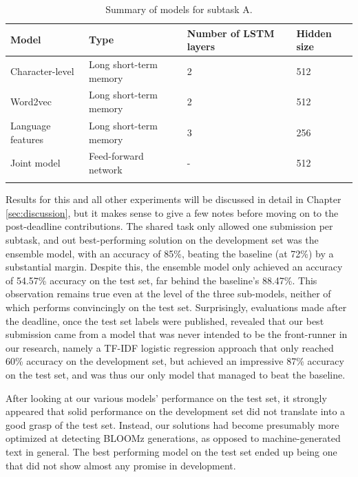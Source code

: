 \begin{table}[ht]
    \centering
    \begin{tabular}{llll}
        \hline
        \textbf{Model}    & \textbf{Type}          & \textbf{Number of LSTM layers} & \textbf{Hidden size} \\
        \hline
        Character-level   & Long short-term memory & 2                              & 512                  \\
        Word2vec          & Long short-term memory & 2                              & 512                  \\
        Language features & Long short-term memory & 3                              & 256                  \\
        Joint model       & Feed-forward network   & -                              & 512                  \\
        \hline
        \vspace{0.1cm}
    \end{tabular}
    \caption{Summary of models for subtask A.}
    \label{tab:a_models}
\end{table}

Results for this and all other experiments will be discussed in detail in Chapter \ref{sec:discussion}, but it makes sense to give a few notes before moving on to the post-deadline contributions.
The shared task only allowed one submission per subtask, and out best-performing solution on the development set was the ensemble model, with an accuracy of 85\%, beating the baseline (at 72\%) by a substantial margin.
Despite this, the ensemble model only achieved an accuracy of 54.57\% accuracy on the test set, far behind the baseline's 88.47\%.
This observation remains true even at the level of the three sub-models, neither of which performs convincingly on the test set.
Surprisingly, evaluations made after the deadline, once the test set labels were published, revealed that our best submission came from a model that was never intended to be the front-runner in our research, namely a TF-IDF logistic regression approach that only reached 60\% accuracy on the development set, but achieved an impressive 87\% accuracy on the test set, and was thus our only model that managed to beat the baseline.

After looking at our various models' performance on the test set, it strongly appeared that solid performance on the development set did not translate into a good grasp of the test set.
Instead, our solutions had become presumably more optimized at detecting BLOOMz generations, as opposed to machine-generated text in general.
The best performing model on the test set ended up being one that did not show almost any promise in development.

